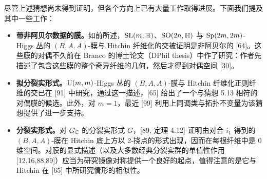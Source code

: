 尽管上述猜想尚未得到证明，但各个方向上已有大量工作取得进展。下面我们提及其中一些工作：

\begin{itemize}[leftmargin=1.4em,itemsep=1pt,topsep=1pt]
\item \textbf{带非阿贝尔数据的膜。}如前所述，$\mathrm{SL}(m,\mathbb{H})$、$\mathrm{SO}(2n,\mathbb{H})$ 与 $\mathrm{Sp}(2m,2m)$-Higgs 丛的 $(B,A,A)$-膜与 Hitchin 纤维化的交被证明是非阿贝尔的 [64]。这些膜的对偶不久前在 Branco 的博士论文（DPhil thesis）中作了研究：作者先描述了包含这些膜的整个奇异纤维的几何，然后才得到对偶空间 [30]。
\item \textbf{拟分裂实形式。}$\mathrm{U}(m,m)$-Higgs 丛的 $(B,A,A)$-膜与 Hitchin 纤维化正则纤维的交已在 [91] 中研究，通过这一描述，[65] 给出了一个与猜想 5.13 相符的对偶膜的候选。此外，对 $m=1$，最近 [99] 利用上同调类与拓扑不变量为该猜想提供了进一步支持。
\item \textbf{分裂实形式。}对 $G_{\mathbb{C}}$ 的分裂实形式 $G$，[89, 定理 4.12] 证明由对合 $i_1$ 得到的 $(B,A,A)$-膜在 Hitchin 底上方以 2-挠点的形式出现，因而在每根纤维中是 0 维空间。对膜的显式描述（以及大多数经典分裂实群的单值性作用 [12,16,88,89]）应当为研究镜像对称提供一个良好的起点，值得注意的是它与 Hitchin 在 [65] 中所研究情形的相似性。
\end{itemize}
